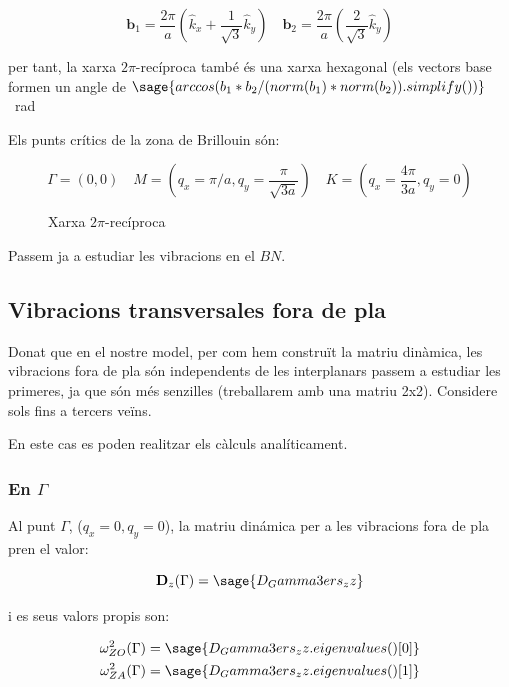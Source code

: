 \documentclass[12pt]{article} %
\let\vec\mathbf %
\begin{document}
{\begin{equation}
\label{eq:11}
\vec b_1=\frac{2\pi}{a}\left(\hat k_{x}+\frac{1}{\sqrt{3}}\hat k_{y}\right)\quad \vec b_2=\frac{2\pi}{a}\left(\frac{2}{\sqrt{3}}\hat k_y\right)
\end{equation} 

per tant, la xarxa $2\pi$-recíproca també és una xarxa hexagonal (els vectors base formen un angle de $\sage{arccos(b_1*b_2/(norm(b_1)*norm(b_2)).simplify())}$ \SI{}{\radian}

Els punts crítics de la zona de Brillouin són:

\begin{equation}
 \label{puntsbrillouin}
 \Gamma=(0,0)\quad M=\left(q_x=\pi/a,q_y=\frac{\pi}{\sqrt{3 a}}\right)\quad K=\left(q_x=\frac{4\pi}{3 a}, q_y=0\right)
\end{equation}

\newpage
\begin{figure}[h]
\centering
{}
\caption{Xarxa $2\pi$-recíproca}
\end{figure}


Passem ja a estudiar les vibracions en el $BN$.
\subsection{Vibracions transversales fora de pla}
Donat que en el nostre model, per com hem construït la matriu dinàmica, les vibracions fora de pla són independents de les interplanars passem a estudiar les primeres, ja que són més senzilles (treballarem amb una matriu 2x2). Considere sols fins a tercers veïns.

En este cas es poden realitzar els càlculs analíticament.

\subsubsection{En $\Gamma$}
Al punt $\Gamma$, ($q_x=0, q_y=0$), la matriu dinámica  per a les vibracions fora de pla pren el valor:

\begin{equation}
\vec D_z(\Gamma)=\sage{D_Gamma3ers_zz}
\end{equation}

i es seus valors propis son:

\begin{equation}\begin{split}
\omega_{ZO}^2(\Gamma)&=\sage{D_Gamma3ers_zz.eigenvalues()[0]}\\
\omega_{ZA}^2(\Gamma)&=\sage{D_Gamma3ers_zz.eigenvalues()[1]} 
\end{split}
\end{equation}



}
\end{document}
